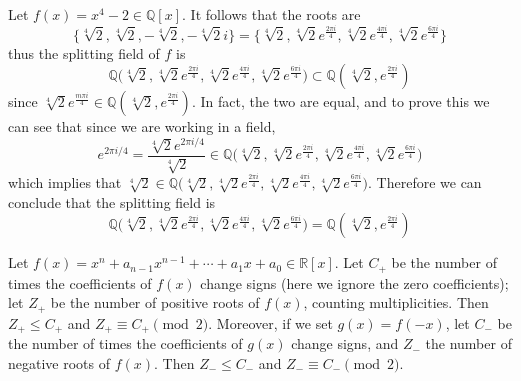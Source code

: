   \begin{example}
    Let $f(x) = x^4 - 2 \in \mathbb{Q}[x]$. It follows that the roots are 
    \begin{equation}
      \{ \sqrt[4]{2}, \sqrt[4]{2}, -\sqrt[4]{2}, - \sqrt[4]{2} i \} = \Big\{ \sqrt[4]{2}, \sqrt[4]{2} e^{\frac{2\pi i}{4}}, \sqrt[4]{2} e^{\frac{4\pi i}{4}}, \sqrt[4]{2} e^{\frac{6\pi i}{4}} \Big\}
    \end{equation}
    thus the splitting field of $f$ is 
    \begin{equation}
      \mathbb{Q} \big( \sqrt[4]{2}, \sqrt[4]{2} e^{\frac{2\pi i}{4}}, \sqrt[4]{2} e^{\frac{4\pi i}{4}}, \sqrt[4]{2} e^{\frac{6\pi i}{4}} \big) \subset \mathbb{Q}(\sqrt[4]{2}, e^{\frac{2\pi i}{4}})
    \end{equation}
    since $\sqrt[4]{2} e^{\frac{m \pi i}{4}} \in \mathbb{Q}(\sqrt[4]{2}, e^{\frac{2\pi i}{4}})$. In fact, the two are equal, and to prove this we can see that since we are working in a field, 
    \begin{equation}
      e^{2 \pi i / 4} = \frac{\sqrt[4]{2} e^{2\pi i/4}}{\sqrt[4]{2}} \in \mathbb{Q} \big( \sqrt[4]{2}, \sqrt[4]{2} e^{\frac{2\pi i}{4}}, \sqrt[4]{2} e^{\frac{4\pi i}{4}}, \sqrt[4]{2} e^{\frac{6\pi i}{4}} \big) 
    \end{equation}
    which implies that $\sqrt[4]{2} \in \mathbb{Q} \big( \sqrt[4]{2}, \sqrt[4]{2} e^{\frac{2\pi i}{4}}, \sqrt[4]{2} e^{\frac{4\pi i}{4}}, \sqrt[4]{2} e^{\frac{6\pi i}{4}} \big)$. Therefore we can conclude that the splitting field is 
    \begin{equation}
      \mathbb{Q} \big( \sqrt[4]{2}, \sqrt[4]{2} e^{\frac{2\pi i}{4}}, \sqrt[4]{2} e^{\frac{4\pi i}{4}}, \sqrt[4]{2} e^{\frac{6\pi i}{4}} \big) = \mathbb{Q}(\sqrt[4]{2}, e^{\frac{2\pi i}{4}})
    \end{equation}
  \end{example} 

  \begin{theorem} 
    \label{thm:descartes}
    Let $f(x) = x^n + a_{n-1}x^{n-1} + \cdots + a_1x + a_0 \in \mathbb{R}[x]$. Let $C_+$ be the number of times the coefficients of $f(x)$ change signs (here we ignore the zero coefficients); let $Z_+$ be the number of positive roots of $f(x)$, counting multiplicities. Then $Z_+ \leq C_+$ and $Z_+ \equiv C_+ \pmod{2}$. Moreover, if we set $g(x) = f(-x)$, let $C_-$ be the number of times the coefficients of $g(x)$ change signs, and $Z_-$ the number of negative roots of $f(x)$. Then $Z_- \leq C_-$ and $Z_- \equiv C_- \pmod{2}$.
  \end{theorem}

